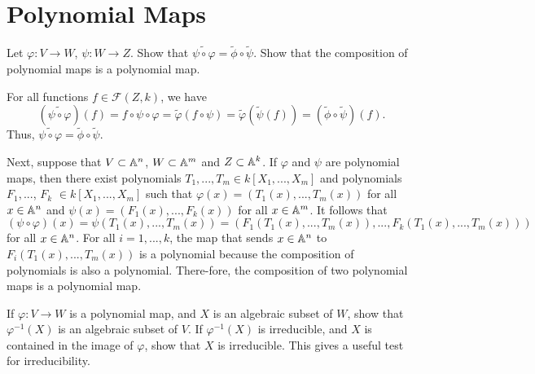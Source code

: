 \section{Polynomial Maps}

\begin{exercise}
    Let $\varphi : V \to W$, $\psi : W \to Z$. Show that $\widetilde{\psi \circ \varphi} = \tilde{\phi} \circ \tilde{\psi}$. Show that the composition of polynomial maps is a polynomial map. \\
\end{exercise}

\begin{solution}
    For all functions $f \in \mathcal{F}(Z,k)$, we have
    $$(\widetilde{\psi \circ \varphi})(f) = f \circ \psi \circ \varphi = \tilde{\varphi}(f \circ \psi) = \tilde{\varphi}(\tilde{\psi}(f)) = (\tilde{\phi} \circ \tilde{\psi})(f).$$
    Thus, $\widetilde{\psi \circ \varphi} = \tilde{\phi} \circ \tilde{\psi}$.
    
    Next, suppose that $V \subset \mathbb{A}^n$, $W \subset \mathbb{A}^m$ and $Z \subset \mathbb{A}^k$. If $\varphi$ and $\psi$ are polynomial maps, then there exist polynomials $T_1, ..., T_m \in k[X_1, ..., X_m]$ and polynomials $F_1, ...$, $F_k$ $ \in k[X_1, ..., X_m]$ such that $\varphi(x) = (T_1(x), ..., T_m(x))$ for all $x \in \mathbb{A}^n$ and $\psi(x) = (F_1(x), ..., F_k(x))$ for all $x \in \mathbb{A}^m$. It follows that
    $$(\psi\circ \varphi)(x) = \psi(T_1(x), ..., T_m(x)) = (F_1(T_1(x), ..., T_m(x)), ..., F_k(T_1(x), ..., T_m(x)))$$
    for all $x \in \mathbb{A}^n$. For all $i = 1, ..., k$, the map that sends $x \in \mathbb{A}^n$ to $F_i(T_1(x), ..., T_m(x))$ is a polynomial because the composition of polynomials is also a polynomial. There-fore, the composition of two polynomial maps is a polynomial map.\\ 
\end{solution}

\begin{exercise}
    If $\varphi : V \to W$ is a polynomial map, and $X$ is an algebraic subset of $W$, show that $\varphi^{-1}(X)$ is an algebraic subset of $V$. If $\varphi^{-1}(X)$ is irreducible, and $X$ is contained in the image of $\varphi$, show that $X$ is irreducible. This gives a useful test for irreducibility. \\
\end{exercise}


